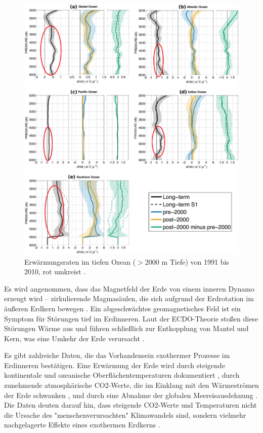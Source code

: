\documentclass[10pt,twocolumn,letterpaper]{article}
\begin{document}
\begin{figure}[t]
\begin{center}
   \includegraphics[width=1\linewidth]{ocean-highlight.jpg}
\end{center}
   \caption{Erwärmungsraten im tiefen Ozean ($>$2000 m Tiefe) von 1991 bis 2010, rot umkreist \cite{132}.}
\label{fig:15}
\label{fig:onecol}
\end{figure}

Es wird angenommen, dass das Magnetfeld der Erde von einem inneren Dynamo erzeugt wird – zirkulierende Magmasäulen, die sich aufgrund der Erdrotation im äußeren Erdkern bewegen \cite{123}. Ein abgeschwächtes geomagnetisches Feld ist ein Symptom für Störungen tief im Erdinneren. Laut der ECDO-Theorie stoßen diese Störungen Wärme aus und führen schließlich zur Entkopplung von Mantel und Kern, was eine Umkehr der Erde verursacht \cite{1}.

Es gibt zahlreiche Daten, die das Vorhandensein exothermer Prozesse im Erdinneren bestätigen. Eine Erwärmung der Erde wird durch steigende kontinentale und ozeanische Oberflächentemperaturen dokumentiert \cite{127,128}, durch zunehmende atmosphärische CO2-Werte, die im Einklang mit den Wärmeströmen der Erde schwanken \cite{129,130}, und durch eine Abnahme der globalen Meereisausdehnung \cite{131}. Die Daten deuten darauf hin, dass steigende CO2-Werte und Temperaturen nicht die Ursache des "menschenverursachten" Klimawandels sind, sondern vielmehr nachgelagerte Effekte eines exothermen Erdkerns \cite{129}.
\end{document}
